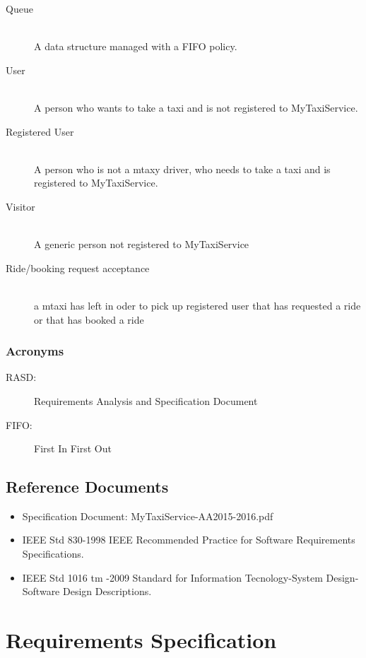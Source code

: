 \documentclass[11pt]{article} %
\begin{document}
\begin{description}
      \item [Queue] \hfill \\ A data structure managed with a FIFO policy.
      \item [User] \hfill \\ A person who wants to take a taxi and is not registered to MyTaxiService.
      \item [Registered User] \hfill \\ A person who is not a mtaxy driver, who needs to take a taxi and is registered to MyTaxiService.
      \item [Visitor]\hfill \\ A generic person not registered to MyTaxiService
      \item [Ride/booking request acceptance] \hfill \\ a mtaxi has left in oder to pick up registered user that has requested a ride or that has booked a ride
       \end{description}

      \subsubsection{Acronyms}
      \begin{description}
        \item [RASD:] Requirements Analysis and Specification Document
        \item [FIFO:] First In First Out
       \end{description}

    \subsection{Reference Documents}
       \begin{itemize}
       	\item Specification Document: MyTaxiService-AA2015-2016.pdf
        	\item IEEE Std 830-1998 IEEE Recommended Practice for Software Requirements Specifications.
        	\item IEEE Std 1016 tm -2009 Standard for Information Tecnology-System Design-Software Design Descriptions.
       \end{itemize}
  

\section{Requirements Specification}
\end{document}

